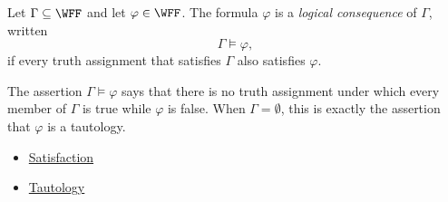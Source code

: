 \begin{tcolorbox}[colback=propbox, colframe=propborder, arc=2pt,
  left=6pt, right=6pt, top=4pt, bottom=4pt,
  title={\small\textbf{Definition (Logical Consequence)}},
  fonttitle=\small\bfseries]
\label{def:logical-consequence-propositional-logic}
Let $\Gamma\subseteq\WFF$ and let $\varphi\in\WFF$. The formula $\varphi$ is a
\emph{logical consequence} of $\Gamma$, written
\[
\Gamma\models\varphi,
\]
if every truth assignment that satisfies $\Gamma$ also satisfies $\varphi$.
\end{tcolorbox}

\begin{remark*}[Interpretation]
The assertion $\Gamma\models\varphi$ says that there is no truth assignment
under which every member of $\Gamma$ is true while $\varphi$ is false. When
$\Gamma=\emptyset$, this is exactly the assertion that $\varphi$ is a
tautology.
\end{remark*}

\begin{dependencies}
\begin{itemize}
  \item \hyperref[def:satisfaction-propositional-logic]{Satisfaction}
  \item \hyperref[def:tautology-propositional-logic]{Tautology}
\end{itemize}
\end{dependencies}
